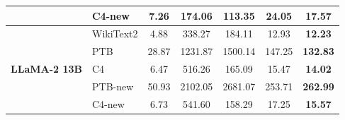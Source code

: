 \begin{table}[htbp]
\begin{tabular}{ll|ccccc}
  & C4-new & 7.26 & 174.06 & 113.35 & 24.05 & \textbf{17.57} \\
  \midrule
  \multirow{5}{*}{\textbf{LLaMA-2 13B}}
  & WikiText2 & 4.88 & 338.27 & 184.11 & 12.93 & \textbf{12.23} \\
  & PTB & 28.87 & 1231.87 & 1500.14 & 147.25 & \textbf{132.83} \\
  & C4 & 6.47 & 516.26 & 165.09 & 15.47 & \textbf{14.02} \\
  & PTB-new & 50.93 & 2102.05 & 2681.07 & 253.71 & \textbf{262.99} \\
  & C4-new & 6.73 & 541.60 & 158.29 & 17.25 & \textbf{15.57} \\
  \bottomrule
\end{tabular}
\end{table}

